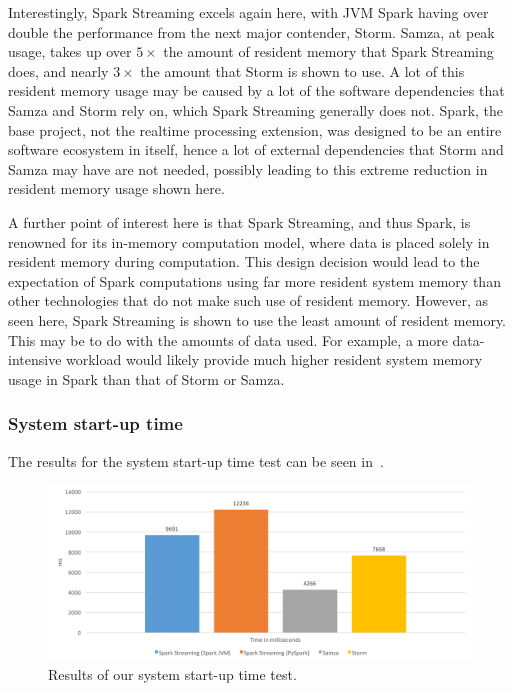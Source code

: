 Interestingly, Spark Streaming excels again here, with JVM Spark having over double the performance from the next major
contender, Storm. Samza, at peak usage, takes up over $5\times$ the amount of resident memory that Spark Streaming does, and
nearly $3\times$ the amount that Storm is shown to use. A lot of this resident memory usage may be caused by a lot of the
software dependencies that Samza and Storm rely on, which Spark Streaming generally does not. Spark, the base project,
not the realtime processing extension, was designed to be an entire software ecosystem in itself, hence a lot of external
dependencies that Storm and Samza may have are not needed, possibly leading to this extreme reduction in resident memory
usage shown here.

A further point of interest here is that Spark Streaming, and thus Spark, is renowned for its in-memory computation model,
where data is placed solely in resident memory during computation. This design decision would lead to the expectation of
Spark computations using far more resident system memory than other technologies that do not make such use of resident memory.
However, as seen here, Spark Streaming is shown to use the least amount of resident memory. This may be to do with the
amounts of data used. For example, a more data-intensive workload would likely provide much higher resident system memory
usage in Spark than that of Storm or Samza.

\subsubsection{System start-up time}

The results for the system start-up time test can be seen in~.

\begin{figure}[H]
  \centering
  \includegraphics[width=1\textwidth]{includes/figures/fig_startup_time_res}
  \caption{Results of our system start-up time test.}
  \label{fig:startup_time}
\end{figure}

